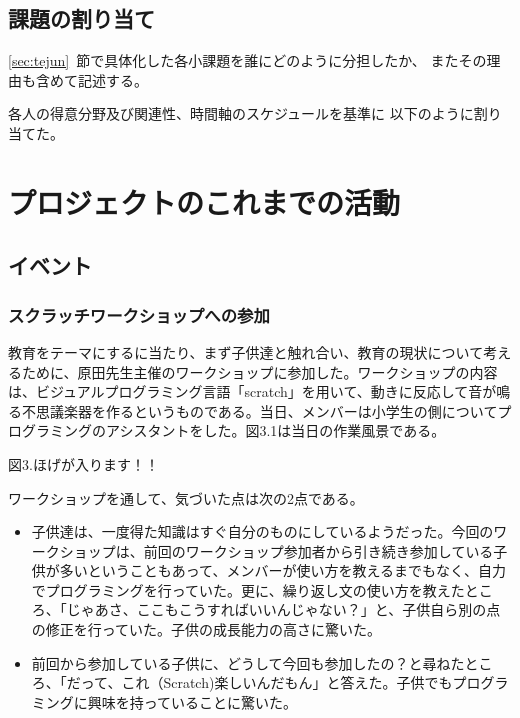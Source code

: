 \documentclass[openany,11pt,papersize]{jsbook}
\begin{document}

\section{課題の割り当て}
\begin{hissu}
\ref{sec:tejun}~節で具体化した各小課題を誰にどのように分担したか、
またその理由も含めて記述する。
\end{hissu}

各人の得意分野及び関連性、時間軸のスケジュールを基準に
以下のように割り当てた。


\chapter{プロジェクトのこれまでの活動}

\section{イベント}

\subsection{スクラッチワークショップへの参加}
\par 教育をテーマにするに当たり、まず子供達と触れ合い、教育の現状について考えるために、原田先生主催のワークショップに参加した。ワークショップの内容は、ビジュアルプログラミング言語「scratch」を用いて、動きに反応して音が鳴る不思議楽器を作るというものである。当日、メンバーは小学生の側についてプログラミングのアシスタントをした。図3.1は当日の作業風景である。

\begin{hissu}
図3.ほげが入ります！！
\end{hissu}

\par ワークショップを通して、気づいた点は次の2点である。
\begin{itemize}
\item 子供達は、一度得た知識はすぐ自分のものにしているようだった。今回のワークショップは、前回のワークショップ参加者から引き続き参加している子供が多いということもあって、メンバーが使い方を教えるまでもなく、自力でプログラミングを行っていた。更に、繰り返し文の使い方を教えたところ、「じゃあさ、ここもこうすればいいんじゃない？」と、子供自ら別の点の修正を行っていた。子供の成長能力の高さに驚いた。
\item 前回から参加している子供に、どうして今回も参加したの？と尋ねたところ、「だって、これ（Scratch)楽しいんだもん」と答えた。子供でもプログラミングに興味を持っていることに驚いた。
\end{itemize}
\end{document}
